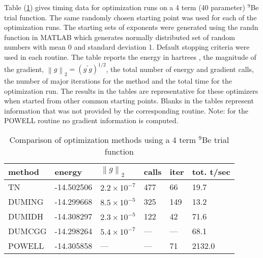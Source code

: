 \documentclass[12pt,thmsa]{article}
\begin{document}
Table (\ref{Betime}) gives timing data for optimization runs on a 4 term (40
parameter) $^9$Be trial function. The same randomly chosen starting point
was used for each of the optimization runs. The starting sets of exponents
were generated using the randn function in MATLAB which generates normally
distributed set of random numbers with mean 0 and standard deviation 1.
Default stopping criteria were used in each routine. The table reports the
energy in hartrees , the magnitude of the gradient, $\left\| g\right\|
_2=\left( g^{\prime }g\right) ^{1/2}$, the total number of energy and
gradient calls, the number of major iterations for the method and the total
time for the optimization run. The results in the tables are representative
for these optimizers when started from other common starting points. Blanks
in the tables represent information that was not provided by the
corresponding routine. Note: for the POWELL routine no gradient information
is computed.

\begin{table}[p] \centering%
\begin{tabular}{llllll}
\hline\hline
method & energy & $\left\| g\right\| _2$ & calls & iter & tot. t/sec \\ 
\hline
TN & -14.502506 & $2.2\times 10^{-7}$ & 477 & 66 & 19.7 \\ 
DUMING & -14.299668 & $8.5\times 10^{-5}$ & 325 & 149 & 13.2 \\ 
DUMIDH & -14.308297 & $2.3\times 10^{-5}$ & 122 & 42 & 71.6 \\ 
DUMCGG & -14.298264 & $5.4\times 10^{-7}$ & --- & --- & 68.1 \\ 
POWELL & -14.305858 & --- & --- & 71 & 2132.0 \\ \hline\hline
\end{tabular}
\caption{Comparison of optimization methods using a 4 term $ ^{9}$Be trial
function\label{Betime}}%
\end{table}%
\end{document}
